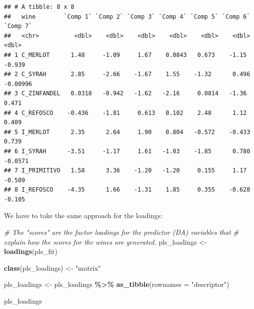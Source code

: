 \documentclass[
]{book}
\newenvironment{Shaded}{\begin{snugshade}}{\end{snugshade}}
\newcommand{\AttributeTok}[1]{\textcolor[rgb]{0.13,0.29,0.53}{#1}}
\newcommand{\CommentTok}[1]{\textcolor[rgb]{0.56,0.35,0.01}{\textit{#1}}}
\newcommand{\FunctionTok}[1]{\textcolor[rgb]{0.13,0.29,0.53}{\textbf{#1}}}
\newcommand{\NormalTok}[1]{#1}
\newcommand{\OtherTok}[1]{\textcolor[rgb]{0.56,0.35,0.01}{#1}}
\newcommand{\SpecialCharTok}[1]{\textcolor[rgb]{0.81,0.36,0.00}{\textbf{#1}}}
\newcommand{\StringTok}[1]{\textcolor[rgb]{0.31,0.60,0.02}{#1}}
\begin{document}
\begin{verbatim}
## # A tibble: 8 x 8
##   wine        `Comp 1` `Comp 2` `Comp 3` `Comp 4` `Comp 5` `Comp 6` `Comp 7`
##   <chr>          <dbl>    <dbl>    <dbl>    <dbl>    <dbl>    <dbl>    <dbl>
## 1 C_MERLOT      1.48     -1.09     1.67    0.0843   0.673    -1.15  -0.939  
## 2 C_SYRAH       2.85     -2.66    -1.67    1.55    -1.32      0.496 -0.00996
## 3 C_ZINFANDEL   0.0318   -0.942   -1.62   -2.16     0.0814   -1.36   0.471  
## 4 C_REFOSCO    -0.436    -1.81     0.613   0.102    2.48      1.12   0.409  
## 5 I_MERLOT      2.35      2.64     1.90    0.804   -0.572    -0.433  0.739  
## 6 I_SYRAH      -3.51     -1.17     1.61   -1.03    -1.85      0.780 -0.0571 
## 7 I_PRIMITIVO   1.58      3.36    -1.20   -1.20     0.155     1.17  -0.509  
## 8 I_REFOSCO    -4.35      1.66    -1.31    1.85     0.355    -0.628 -0.105
\end{verbatim}

We have to take the same approach for the loadings:

\begin{Shaded}
\begin{Highlighting}[]
\CommentTok{\# The "scores" are the factor loadings for the predictor (DA) variables that}
\CommentTok{\# explain how the scores for the wines are generated.}
\NormalTok{pls\_loadings }\OtherTok{\textless{}{-}} \FunctionTok{loadings}\NormalTok{(pls\_fit)}

\FunctionTok{class}\NormalTok{(pls\_loadings) }\OtherTok{\textless{}{-}} \StringTok{"matrix"}

\NormalTok{pls\_loadings }\OtherTok{\textless{}{-}} 
\NormalTok{  pls\_loadings }\SpecialCharTok{\%\textgreater{}\%}
  \FunctionTok{as\_tibble}\NormalTok{(}\AttributeTok{rownames =} \StringTok{"descriptor"}\NormalTok{)}

\NormalTok{pls\_loadings}
\end{Highlighting}
\end{Shaded}
\end{document}
